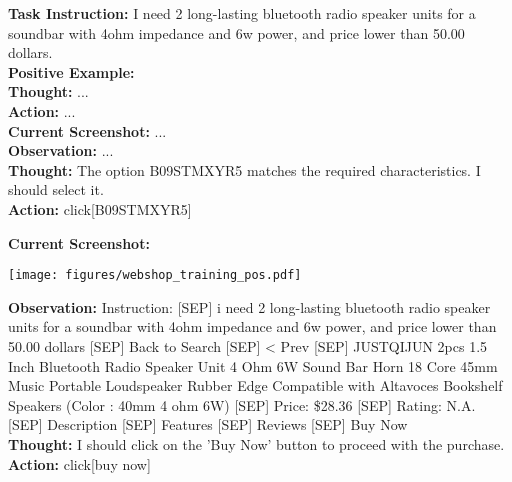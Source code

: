 \begin{tcolorbox}[breakable,title=Training Data Example for Webshop]
\textcolor{my_blue!50}{\textbf{Task Instruction:} I need 2 long-lasting bluetooth radio speaker units for a soundbar with 4ohm impedance and 6w power, and price lower than 50.00 dollars.}\\

\textcolor{my_green!50}{\textbf{Positive Example:} }\\
\textcolor{my_purple}{\textbf{Thought:} ...}\\
\textcolor{my_purple}{\textbf{Action:} ...}\\
\textcolor{my_blue!50}{\textbf{Current Screenshot:} ...}\\
\textcolor{my_blue!50}{\textbf{Observation:} ...}\\
\textcolor{my_purple}{\textbf{Thought:} The option B09STMXYR5 matches the required characteristics. I should select it.}\\
\textcolor{my_purple}{\textbf{Action:} click[B09STMXYR5]}\\
\textcolor{my_blue!50}{\textbf{Current Screenshot:} \begin{center}\texttt{[image: figures/webshop\_training\_pos.pdf]}\end{center}}
\textcolor{my_blue!50}{\textbf{Observation:} Instruction: [SEP] i need 2 long-lasting bluetooth radio speaker units for a soundbar with 4ohm impedance and 6w power, and price lower than 50.00 dollars [SEP] Back to Search [SEP] < Prev [SEP] JUSTQIJUN 2pcs 1.5 Inch Bluetooth Radio Speaker Unit 4 Ohm 6W Sound Bar Horn 18 Core 45mm Music Portable Loudspeaker Rubber Edge Compatible with Altavoces Bookshelf Speakers (Color : 40mm 4 ohm 6W) [SEP] Price: \$28.36 [SEP] Rating: N.A. [SEP] Description [SEP] Features [SEP] Reviews [SEP] Buy Now}\\
\textcolor{my_purple}{\textbf{Thought:} I should click on the 'Buy Now' button to proceed with the purchase.}\\
\textcolor{my_purple}{\textbf{Action:} click[buy now]}\\


\end{tcolorbox}
